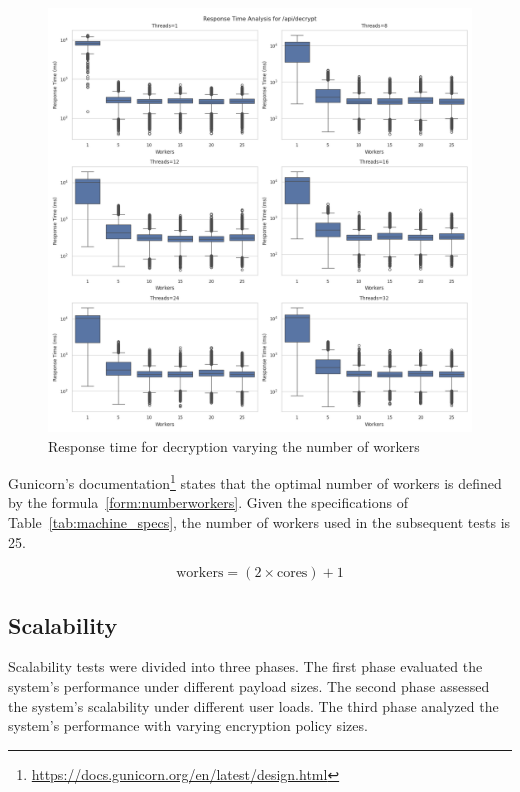 \documentclass[cic,tc,english]{iiufrgs}
\begin{document}
            \begin{figure}
                \centering
                \includegraphics[width=\textwidth]{images/phase1/api_decrypt/response_time_threads_summary.png}
                \caption{Response time for decryption varying the number of workers}
                \label{fig:decrypt_response_time_threads}
            \end{figure}


            Gunicorn's documentation\footnote{\url{https://docs.gunicorn.org/en/latest/design.html}} states that the optimal number of workers is defined by the formula~\ref{form:numberworkers}. Given the specifications of Table~\ref{tab:machine_specs}, the number of workers used in the subsequent tests is 25.

            \begin{equation}
                \label{form:numberworkers}
                \text{workers} = (2 \times \text{cores}) + 1
            \end{equation}


        \subsection{Scalability}
            \label{sec:encryptiontime}
            Scalability tests were divided into three phases. The first phase evaluated the system's performance under different payload sizes. The second phase assessed the system's scalability under different user loads. The third phase analyzed the system's performance with varying encryption policy sizes.
\end{document}
